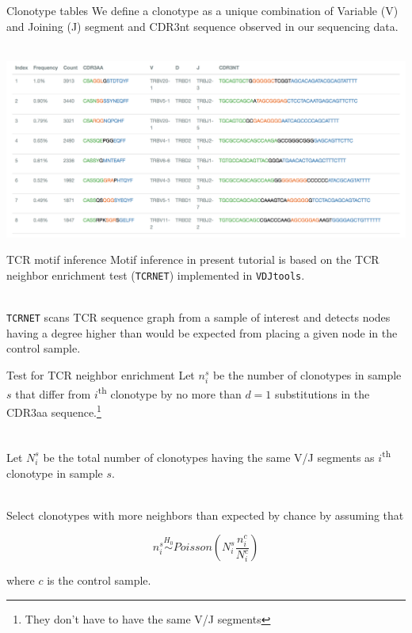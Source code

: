 \documentclass[12pt]{beamer}
\begin{document}
\begin{frame}{Clonotype tables}
We define a clonotype as a unique combination of Variable (V) and Joining (J) segment and CDR3nt sequence observed in our sequencing data.\\~\

\includegraphics[width=\textwidth]{clonotype_table}
\end{frame}

\begin{frame}{TCR motif inference}
Motif inference in present tutorial is based on the TCR neighbor enrichment test (\texttt{TCRNET}) implemented in \texttt{VDJtools}.\\~\

\texttt{TCRNET} scans TCR sequence graph from a sample of interest and detects nodes having a degree higher than would be expected from placing a given node in the control sample.
\end{frame}

\begin{frame}{Test for TCR neighbor enrichment}
Let $n_i^s$ be the number of clonotypes in sample $s$ that differ from $i$\textsuperscript{th} clonotype by no more than $d=1$ substitutions in the CDR3aa sequence.\footnote{They don't have to have the same V/J segments}\\~\

Let $N_i^s$ be the total number of clonotypes having the same V/J segments as $i$\textsuperscript{th} clonotype in sample $s$.\\~\

Select clonotypes with more neighbors than expected by chance by assuming that

\begin{equation}
n_i^s\stackrel{H_0}{\sim} Poisson\left(N_i^s\frac{n_i^c}{N_i^c}\right)
\end{equation}

where $c$ is the control sample.
\end{frame}
\end{document}

